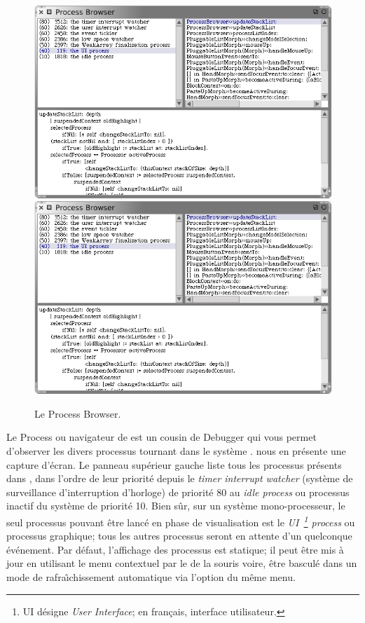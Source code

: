 \documentclass[a4paper,10pt,twoside]{book}
\begin{document}
\begin{figure}[btp]
	\begin{center}
	\ifluluelse
		{\includegraphics[width=\textwidth]{processBrowser}}
		{\includegraphics[scale=0.7]{processBrowser}}
	\end{center}
	\caption{Le Process Browser.}
	\label{fig:processBrowser}
\end{figure}

Le Process  ou navigateur de  
est un cousin de Debugger qui vous permet d'observer les divers processus tournant
dans le syst\`eme \sq.
 nous en pr\'esente une capture d'\'ecran.
Le panneau sup\'erieur gauche liste tous les processus pr\'esents dans \sq, 
dans l'ordre de leur priorit\'e depuis le \emph{timer interrupt watcher} 
(syst\`eme de surveillance d'interruption d'horloge) de priorit\'e
80 au \emph{idle process} ou processus inactif du syst\`eme de priorit\'e 10.
Bien s\^ur, sur un syst\`eme mono-processeur, le seul processus pouvant \^etre 
lanc\'e en phase de visualisation est le \emph{UI~\footnote{UI d\'esigne 
\emph{User Interface}; en fran\c{c}ais, interface utilisateur.} process} 
ou processus graphique;
tous les autres processus seront en attente d'un quelconque \'ev\'enement.
Par d\'efaut, l'affichage des processus est statique; il peut \^etre mis \`a jour
en utilisant le menu contextuel par le  de la souris voire,
\^etre bascul\'e dans un mode de rafra\^{\i}chissement automatique
via l'option  du m\^eme menu.
\end{document}
